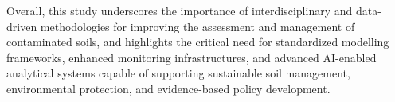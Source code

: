 \documentclass[environments,article,submit,pdftex,moreauthors]{Definitions/mdpi}
\begin{document}
Overall, this study underscores the importance of interdisciplinary and data-driven methodologies for improving the assessment and management of contaminated soils, and highlights the critical need for standardized modelling frameworks, enhanced monitoring infrastructures, and advanced AI-enabled analytical systems capable of supporting sustainable soil management, environmental protection, and evidence-based policy development.








\end{document}
